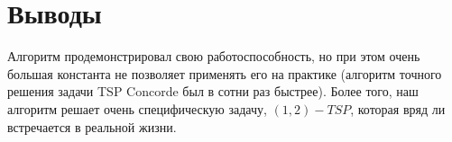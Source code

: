 \section{Выводы}
Алгоритм продемонстрировал свою работоспособность, но при этом очень большая константа не позволяет применять его на практике (алгоритм точного решения задачи TSP Concorde был в сотни раз быстрее). Более того, наш алгоритм решает очень специфическую задачу, $(1, 2)-TSP$, которая вряд ли встречается в реальной жизни.


